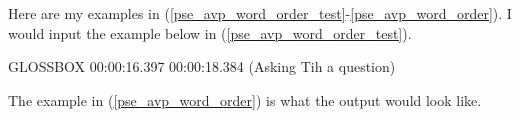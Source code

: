 \documentclass{article}
\begin{document}
  \noindent Here are my examples in (\ref{pse_avp_word_order_test}-\ref{pse_avp_word_order}). I would input the example below in (\ref{pse_avp_word_order_test}). 
   
  \pex[lingstyle=conversation] \label{pse_avp_word_order_test}
  GLOSSBOX 00:00:16.397 00:00:18.384 (Asking Tih a question)
  \xe
  
  \vspace{2in}
 
 \noindent The example in (\ref{pse_avp_word_order}) is what the output would look like. 
 
\end{document}

